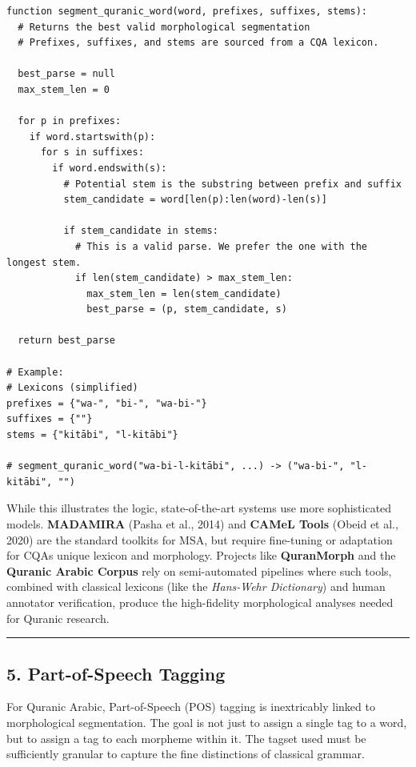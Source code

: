 \documentclass[12pt,a4paper]{article}
\begin{document}
\begin{verbatim}
function segment_quranic_word(word, prefixes, suffixes, stems):
  # Returns the best valid morphological segmentation
  # Prefixes, suffixes, and stems are sourced from a CQA lexicon.
  
  best_parse = null
  max_stem_len = 0

  for p in prefixes:
    if word.startswith(p):
      for s in suffixes:
        if word.endswith(s):
          # Potential stem is the substring between prefix and suffix
          stem_candidate = word[len(p):len(word)-len(s)]
          
          if stem_candidate in stems:
            # This is a valid parse. We prefer the one with the longest stem.
            if len(stem_candidate) > max_stem_len:
              max_stem_len = len(stem_candidate)
              best_parse = (p, stem_candidate, s)
              
  return best_parse

# Example:
# Lexicons (simplified)
prefixes = {"wa-", "bi-", "wa-bi-"}
suffixes = {""}
stems = {"kitābi", "l-kitābi"}

# segment_quranic_word("wa-bi-l-kitābi", ...) -> ("wa-bi-", "l-kitābi", "")
\end{verbatim}

While this illustrates the logic, state-of-the-art systems use more
sophisticated models. \textbf{MADAMIRA} (Pasha et al., 2014) and
\textbf{CAMeL Tools} (Obeid et al., 2020) are the standard toolkits for
MSA, but require fine-tuning or adaptation for CQA\textquotesingle s
unique lexicon and morphology. Projects like \textbf{QuranMorph} and the
\textbf{Quranic Arabic Corpus} rely on semi-automated pipelines where
such tools, combined with classical lexicons (like the \emph{Hans-Wehr
Dictionary}) and human annotator verification, produce the high-fidelity
morphological analyses needed for Quranic research.

\begin{center}\rule{0.5\linewidth}{0.5pt}\end{center}

\protect{}\label{s5}
\subsection{5. Part-of-Speech Tagging}\label{part-of-speech-tagging}

For Quranic Arabic, Part-of-Speech (POS) tagging is inextricably linked
to morphological segmentation. The goal is not just to assign a single
tag to a word, but to assign a tag to each morpheme within it. The
tagset used must be sufficiently granular to capture the fine
distinctions of classical grammar.
\end{document}
